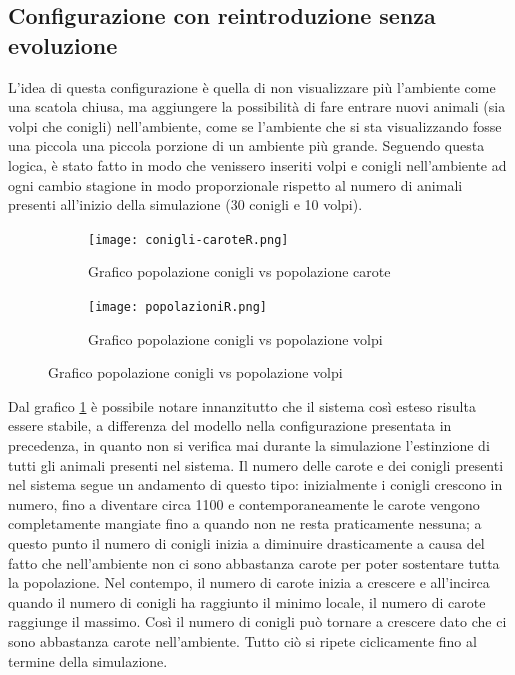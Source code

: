 \documentclass[11pt]{article}
\begin{document}
\subsection{Configurazione con reintroduzione senza evoluzione}
L'idea di questa configurazione è quella di non visualizzare più l'ambiente come una scatola chiusa, ma aggiungere la possibilità di fare entrare nuovi animali (sia volpi che conigli) nell'ambiente, come se l'ambiente che si sta visualizzando fosse una piccola una piccola porzione di un ambiente più grande. 
Seguendo questa logica, è stato fatto in modo che venissero inseriti volpi e conigli nell'ambiente ad ogni cambio stagione in modo proporzionale rispetto al numero di animali presenti all'inizio della simulazione (30 conigli e 10 volpi). %


\begin{figure}[h!]
	\hspace{-5mm}
	\begin{subfigure}{.5\textwidth}
            \centering
     \texttt{[image: conigli-caroteR.png]}
     \caption{Grafico popolazione conigli vs popolazione carote}
     \label{fig:conigliCaroteReintroduzione}
	\end{subfigure}
	\begin{subfigure}{.5\textwidth}
		\hspace{5mm}
		\centering
     \texttt{[image: popolazioniR.png]}
     \caption{Grafico popolazione conigli vs popolazione volpi}
     \label{fig:conigliVolpiReintroduzione}
	\end{subfigure}
\end{figure}


Dal grafico \ref{fig:conigliCaroteReintroduzione} è possibile notare innanzitutto che il sistema così esteso risulta essere stabile, a differenza del modello nella configurazione presentata in precedenza, in quanto non si verifica mai durante la simulazione l'estinzione di tutti gli animali presenti nel sistema. 
Il numero delle carote e dei conigli presenti nel sistema segue un andamento di questo tipo: inizialmente i conigli crescono in numero, fino a diventare circa 1100 e contemporaneamente le carote vengono completamente mangiate fino a quando non ne resta praticamente nessuna; a questo punto il numero di conigli inizia a diminuire drasticamente a causa del fatto che nell'ambiente non ci sono abbastanza carote per poter sostentare tutta la popolazione. Nel contempo, il numero di carote inizia a crescere e all'incirca quando il numero di conigli ha raggiunto il minimo locale, il numero di carote raggiunge il massimo. Così il numero di conigli può tornare a crescere dato che ci sono abbastanza carote nell'ambiente. Tutto ciò si ripete ciclicamente fino al termine della simulazione. 
\end{document}
